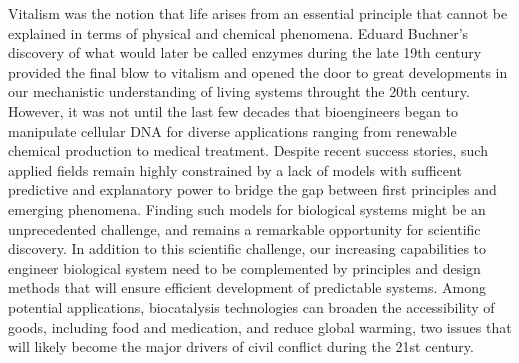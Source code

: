 Vitalism was the notion that life arises from an essential principle that cannot be explained in terms of physical and chemical phenomena.
Eduard Buchner's discovery of what would later be called enzymes during the late 19th century provided the final blow to vitalism and opened the door to
great developments in our mechanistic understanding of living systems throught the 20th century.
However, it was not until the last few decades that bioengineers began to manipulate cellular DNA for diverse applications ranging from renewable chemical production to medical treatment. Despite recent success stories, such applied fields remain highly constrained by a lack of models with sufficent predictive and explanatory power to bridge the gap between first principles and emerging phenomena.
Finding such models for biological systems might be an unprecedented challenge, and remains a remarkable opportunity for scientific discovery.
In addition to this scientific challenge, our increasing capabilities to engineer biological system need to be complemented by principles and design methods that will ensure efficient development of predictable systems.
Among potential applications, biocatalysis technologies can broaden the accessibility of goods, including food and medication, and reduce global warming, two issues that will likely become the major drivers of civil conflict during the 21st century. %


